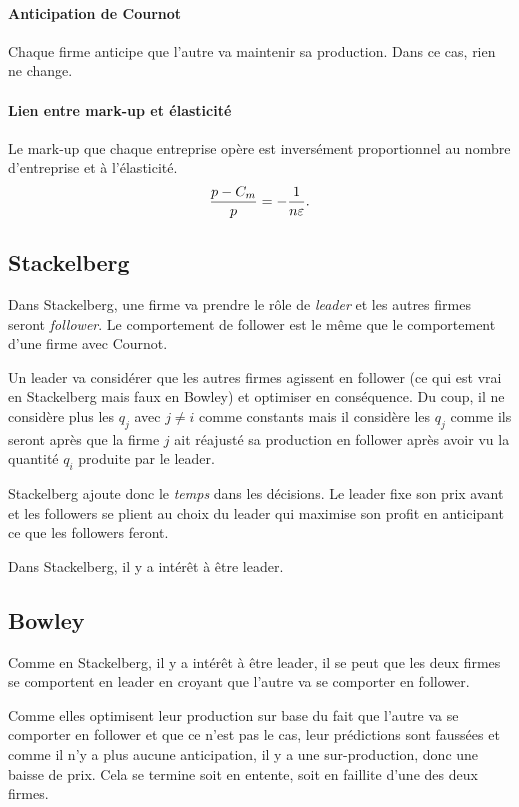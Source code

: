 \paragraph{Anticipation de Cournot}
Chaque firme anticipe que l'autre va maintenir sa production.
Dans ce cas, rien ne change.

\paragraph{Lien entre mark-up et élasticité}
Le mark-up que chaque entreprise opère est inversément proportionnel
au nombre d'entreprise et à l'élasticité.
\[ \frac{p-C_m}{p} = -\frac{1}{n\varepsilon}. \]

\subsection{Stackelberg}
Dans Stackelberg, une firme va prendre le rôle de \emph{leader}
et les autres firmes seront \emph{follower}.
Le comportement de follower est le même que le comportement d'une firme
avec Cournot.

Un leader va considérer que les autres firmes agissent en follower
(ce qui est vrai en Stackelberg mais faux en Bowley) et optimiser en
conséquence.
Du coup, il ne considère plus les $q_j$ avec $j \neq i$ comme constants mais
il considère les $q_j$ comme ils seront après que la firme $j$
ait réajusté sa production en follower après avoir vu la quantité $q_i$
produite par le leader.

Stackelberg ajoute donc le \emph{temps} dans les décisions.
Le leader fixe son prix avant et
les followers se plient au choix du leader qui maximise son profit en
anticipant ce que les followers feront.

Dans Stackelberg, il y a intérêt à être leader.

\subsection{Bowley}
Comme en Stackelberg, il y a intérêt à être leader,
il se peut que les deux firmes se comportent en leader
en croyant que l'autre va se comporter en follower.

Comme elles optimisent leur production sur base du fait que l'autre
va se comporter en follower et que ce n'est pas le cas,
leur prédictions sont faussées et comme
il n'y a plus aucune anticipation,
il y a une sur-production, donc une baisse de prix.
Cela se termine soit en entente, soit en faillite d'une des deux firmes.

